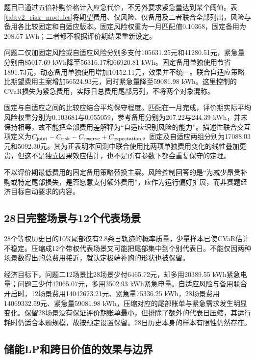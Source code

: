 题目已通过五倍补购价格计入应急代价，不另外要求紧急量达到某个阈值。表\ref{tab:v2_risk_modules}将期望费用、仅风险、仅备用及二者联合全部列出，风险与备用各比较固定和自适应版本。固定风险权重为一月匹配值0.10368，固定备用为208.67 kWh；二者都不根据评价期结果重新设定。




问题二仅加固定风险或自适应风险分别多支付105631.25元和41280.51元，紧急量分别由85017.69 kWh降至56316.17和66920.81 kWh。固定备用单独使用节省1891.73元，动态备用单独使用增加10152.11元，效果并不统一。联合自适应策略比期望费用主案增加56524.93元，同时紧急量降至59081.98 kWh。这里控制的CVaR损失为紧急费用，实际日总费用尾部另列，不将两个对象混称。

固定与自适应之间的比较应结合平均保守程度。匹配在一月完成，评价期实际平均风险权重分别为0.103681与0.055059，参考备用分别为207.22与244.39 kWh，并未保持相等，故不能把全部费用差解释为“自适应识别风险的能力”。描述性联合交互项定义为$C_{\rm joint}-C_{\rm risk}-C_{\rm reserve}+C_{\rm expectation}$，固定及自适应两组分别为17088.03元和5092.30元。其为正表明本回测中联合使用比两项单独费用变化的线性叠加更贵，但这不是独立因果效应估计，也不是所有参数下都会重复保守的定理。

不以评价期最低费用的固定备用策略替换主案。风险控制回答的是“为减少昂贵补购或特定尾部损失，是否愿意支付额外费用”，应作为运行偏好扩展，而非赛题经济目标自动要求的内容。

\subsection{28日完整场景与12个代表场景}

28个等权历史日的10\%尾部仅有2.8条日轨迹的概率质量，少量样本已使CVaR估计不稳定。压缩成12个带权代表场景又可能把尾部集中到个别代表日。不能仅因两种场景数得出的总费用接近，就认定极端补购的形状也被保留。




经济目标下，问题二12场景比28场景少付6465.72元，却多用20389.55 kWh紧急电量；问题三少付42065.07元，多用3502.93 kWh紧急电量。自适应风险与备用联合开启时，12场景费用14042623.21元、紧急量75336.25 kWh，28场景费用14069332.59元、紧急量59081.98 kWh，压缩对应的尾部账单与紧急需求发生明显变化。保留28场景没有保证评价期账单最小，但排除了额外的代表日压缩，其运行耗时仍适合本题规模，故按预定设置保留。28日历史本身的样本有限性仍然存在。

\subsection{储能LP和跨日价值的效果与边界}

